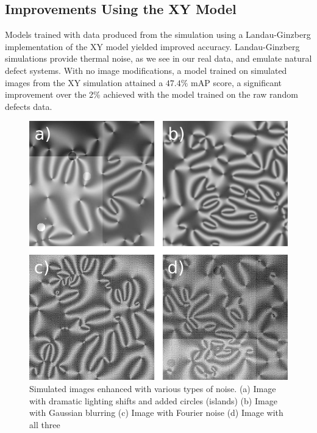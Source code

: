 \documentclass[twoside,twocolumn,9pt]{article}
\begin{document}
\subsection{Improvements Using the XY Model}
Models trained with data produced from the simulation using a Landau-Ginzberg implementation of the XY model yielded improved accuracy. Landau-Ginzberg simulations provide thermal noise, as we see in our real data, and emulate natural defect systems. With no image modifications, a model trained on simulated images from the XY simulation attained a $47.4\%$ mAP score, a significant improvement over the 2\% achieved with the model trained on the raw random defects data. 
\begin{figure}[h!]
  \includegraphics[width=\linewidth]{ImageEnhancement.png}
  \caption{Simulated images enhanced with various types of noise. (a) Image with dramatic lighting shifts and added circles (islands) (b) Image with Gaussian blurring (c) Image with Fourier noise (d) Image with all three}
  \label{fig:Image Enhancement}
\end{figure}
\end{document}
